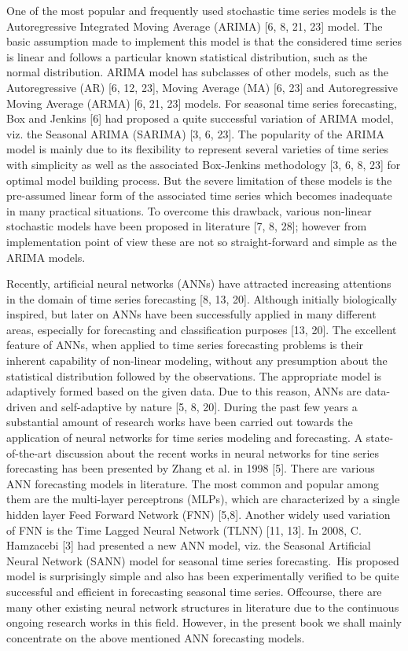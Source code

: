 \documentclass[12pt,a4paper]{article}
\begin{document}
	One of the most popular and frequently used stochastic time series models is the
	Autoregressive Integrated Moving Average (ARIMA) [6, 8, 21, 23] model. The basic
	assumption made to implement this model is that the considered time series is linear and follows a particular known statistical distribution, such as the normal distribution. ARIMA model has subclasses of other models, such as the Autoregressive (AR) [6, 12, 23], Moving Average (MA) [6, 23] and Autoregressive Moving Average (ARMA) [6, 21, 23] models. For seasonal time series forecasting, Box and Jenkins [6] had proposed a quite successful variation of ARIMA model, viz. the Seasonal ARIMA (SARIMA) [3, 6, 23]. The popularity of the ARIMA model is mainly due to its flexibility to represent several varieties of time series with simplicity as well as the associated Box-Jenkins methodology [3, 6, 8, 23] for optimal model building process. But the severe limitation of these models is the pre-assumed linear form of the associated time series which becomes inadequate in many practical situations. To overcome this drawback, various non-linear stochastic models have been proposed in literature
	[7, 8, 28]; however from implementation point of view these are not so straight-forward and simple as the ARIMA models.\
	
	Recently, artificial neural networks (ANNs) have attracted increasing attentions in the  domain of time series forecasting [8, 13, 20]. Although initially biologically inspired, but later on ANNs have been successfully applied in many different areas, especially for forecasting and classification purposes [13, 20]. The excellent feature of ANNs, when applied to time series forecasting problems is their inherent capability of non-linear modeling, without any presumption about the statistical distribution followed by the observations. The appropriate model is adaptively formed based on the given data. Due to this reason, ANNs are data-driven and self-adaptive by nature [5, 8, 20]. During the past few years a substantial amount of research works have been carried out towards the application of neural networks for time series modeling and forecasting. A state-of-the-art discussion about the recent works in neural networks for tine series forecasting has been presented by Zhang et al. in 1998 [5]. There are
	various ANN forecasting models in literature. The most common and popular among them are the multi-layer perceptrons (MLPs), which are characterized by a single hidden layer Feed Forward Network (FNN) [5,8]. Another widely used variation of FNN is the Time Lagged Neural Network (TLNN) [11, 13]. In 2008, C. Hamzacebi [3] had presented a new ANN model, viz. the Seasonal Artificial Neural Network (SANN) model for seasonal time series forecasting.\
	His proposed model is surprisingly simple and also has been experimentally verified to be quite successful and efficient in forecasting seasonal time series. Offcourse, there are many other existing neural network structures in literature due to the continuous ongoing research
	works in this field. However, in the present book we shall mainly concentrate on the above mentioned ANN forecasting models.\
	
\end{document}
